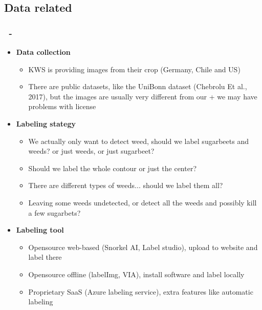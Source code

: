 \documentclass{beamer}
\begin{document}
\subsection{Data related}
\begin{frame}
\frametitle{\secname\ - \subsecname}
\begin{itemize}
\item \textbf{Data collection}
\begin{itemize}
    \item KWS is providing images from their crop (Germany, Chile and US)
    \item There are public datasets, like the UniBonn dataset (Chebrolu Et al., 2017), but the images are usually very different from our + we may have problems with license
\end{itemize}
\item \textbf{Labeling stategy}
\begin{itemize}
    \item We actually only want to detect weed, should we label sugarbeets and weeds? or just weeds, or just sugarbeet?
    \item Should we label the whole contour or just the center?
    \item There are different types of weeds... should we label them all?
    \item Leaving some weeds undetected, or detect all the weeds and possibly kill a few sugarbets?
\end{itemize}
\item \textbf{Labeling tool}
\begin{itemize}
    \item Opensource web-based (Snorkel AI, Label studio), upload to website and label there
    \item Opensource offline (labelImg, VIA), install software and label locally
    \item Proprietary SaaS (Azure labeling service), extra features like automatic labeling
\end{itemize}
\end{itemize}
\end{frame}
\end{document}
